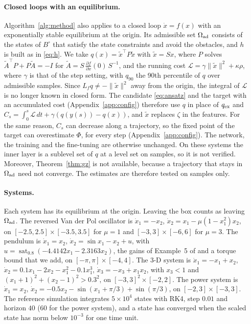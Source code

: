 \paragraph{Closed loops with an equilibrium.} Algorithm~\ref{alg:method} also applies to a closed loop $\dot x=f(x)$ with an exponentially stable equilibrium at the origin. Its admissible set $\Omega_{\mathrm{ad}}$ consists of the states of $B^\circ$ that satisfy the state constraints and avoid the obstacles, and $h$ is built as in \eqref{eq:h}. We take $q(x)=\tilde x^\top P\tilde x$ with $\tilde x=Sx$, where $P$ solves $\tilde A^\top P+P\tilde A=-I$ for $\tilde A=S\,\tfrac{\partial f}{\partial x}(0)\,S^{-1}$, and the running cost $\mathcal L=\gamma\|\tilde x\|^2+\kappa\rho$, where $\gamma$ is that of the step setting, with $q_{90}$ the 90th percentile of $q$ over admissible samples. Since $L_fq\neq-\|\tilde x\|^2$ away from the origin, the integral of $\mathcal L$ is no longer known in closed form. The candidate \eqref{eq:ansatz} and the target with an accumulated cost (Appendix~\ref{app:config}) therefore use $q$ in place of $q_{\mathrm{ex}}$ and $C_s=\int_0^s\mathcal L\,dt+\gamma(q(y(s))-q(x))$, and $\tilde x$ replaces $\zeta$ in the features. For the same reason, $C_s$ can decrease along a trajectory, so the fixed point of the target can overestimate $\Phi$, for every step (Appendix~\ref{app:config}). The network, the training and the fine-tuning are otherwise unchanged. On these systems the inner layer is a sublevel set of $q$ at a level set on samples, so it is not verified. Moreover, Theorem~\ref{thm:gz} is not available, because a trajectory that stays in $\Omega_{\mathrm{ad}}$ need not converge. The estimates are therefore tested on samples only.

\paragraph{Systems.} Each system has its equilibrium at the origin. Leaving the box counts as leaving $\Omega_{\mathrm{ad}}$. The reversed Van der Pol oscillator is $\dot x_1=-x_2$, $\dot x_2=x_1-\mu(1-x_1^2)x_2$, on $[-2.5,2.5]\times[-3.5,3.5]$ for $\mu=1$ and $[-3,3]\times[-6,6]$ for $\mu=3$. The pendulum is $\dot x_1=x_2$, $\dot x_2=\sin x_1-x_2+u$, with $u=\operatorname{sat}_{0.8}(-4.4142x_1-2.3163x_2)$, the gains of Example~5 of \citet{liu2025} and a torque bound that we add, on $[-\pi,\pi]\times[-4,4]$. The 3-D system is $\dot x_1=-x_1+x_2$, $\dot x_2=0.1x_1-2x_2-x_1^2-0.1x_1^3$, $\dot x_3=-x_3+x_1x_2$, with $x_3<1$ and $(x_1+1)^2+(x_2-1)^2>0.3^2$, on $[-3,3]^2\times[-2,2]$. The power system is $\dot x_1=x_2$, $\dot x_2=-0.5x_2-\sin(x_1+\pi/3)+\sin(\pi/3)$, on $[-2,3]\times[-3,3]$. The reference simulation integrates $5\times10^4$ states with RK4, step $0.01$ and horizon $40$ ($60$ for the power system), and a state has converged when the scaled state has norm below $10^{-3}$ for one time unit.

